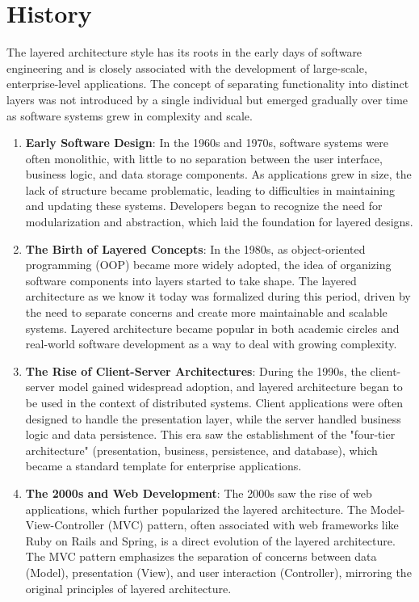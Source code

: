\section{History}

The layered architecture style has its roots in the early days of software engineering and is closely associated with the development of large-scale, enterprise-level applications. The concept of separating functionality into distinct layers was not introduced by a single individual but emerged gradually over time as software systems grew in complexity and scale. 

\begin{enumerate}
	\item \textbf{Early Software Design}: 
	In the 1960s and 1970s, software systems were often monolithic, with little to no separation between the user interface, business logic, and data storage components. As applications grew in size, the lack of structure became problematic, leading to difficulties in maintaining and updating these systems. Developers began to recognize the need for modularization and abstraction, which laid the foundation for layered designs.
	
	\item \textbf{The Birth of Layered Concepts}: 
	In the 1980s, as object-oriented programming (OOP) became more widely adopted, the idea of organizing software components into layers started to take shape. The layered architecture as we know it today was formalized during this period, driven by the need to separate concerns and create more maintainable and scalable systems. Layered architecture became popular in both academic circles and real-world software development as a way to deal with growing complexity.
	
	\item \textbf{The Rise of Client-Server Architectures}: 
	During the 1990s, the client-server model gained widespread adoption, and layered architecture began to be used in the context of distributed systems. Client applications were often designed to handle the presentation layer, while the server handled business logic and data persistence. This era saw the establishment of the "four-tier architecture" (presentation, business, persistence, and database), which became a standard template for enterprise applications.
	
	\item \textbf{The 2000s and Web Development}: 
	The 2000s saw the rise of web applications, which further popularized the layered architecture. The Model-View-Controller (MVC) pattern, often associated with web frameworks like Ruby on Rails and Spring, is a direct evolution of the layered architecture. The MVC pattern emphasizes the separation of concerns between data (Model), presentation (View), and user interaction (Controller), mirroring the original principles of layered architecture.
	

\end{enumerate}
